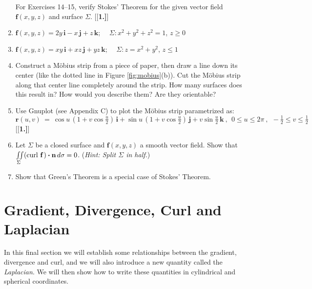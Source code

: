 \begin{enumerate}[\bfseries 1.]
\par\noindent For Exercises 14--15, verify Stokes' Theorem for the given vector field $\textbf{f}(x,y,z)$ and
surface $\Sigma$.
[{[\bfseries 1.]}]
 \item $\textbf{f}(x,y,z) = 2y\,\textbf{i} - x\,\textbf{j} + z\,\textbf{k}$; $\quad \Sigma: x^2 + y^2 + z^2 = 1$,
  $z \ge 0$
 \item $\textbf{f}(x,y,z) = xy\,\textbf{i} + xz\,\textbf{j} + yz\,\textbf{k}$; $\quad \Sigma: z=x^2 + y^2$, $z \le 1$
 \item Construct a M\"{o}bius strip from a piece of paper, then draw a line down its center (like the dotted line in
 Figure \ref{fig:mobius}(b)). Cut the M\"{o}bius strip along that center line completely around the strip. How many
 surfaces does this result in? How would you describe them? Are they orientable?
 \item Use Gnuplot (see Appendix C) to plot the M\"{o}bius strip parametrized as:
  \begin{displaymath}
   \textbf{r}(u,v) ~=~ \cos u \,(1+v\cos \tfrac{u}{2})\,\textbf{i} + \sin u \,(1+v\cos \tfrac{u}{2})\,\textbf{j} +
    v\sin \tfrac{u}{2}\,\textbf{k} ~,~~ 0 \le u \le 2\pi ~,~~ -\tfrac{1}{2} \le v \le \tfrac{1}{2}
  \end{displaymath}
[{[\bfseries 1.]}]
 \item Let $\Sigma$ be a closed surface and $\textbf{f}(x,y,z)$ a smooth vector field. Show that\\
  $\iint\limits_{\Sigma} (\text{curl}~{\textbf{f}}\,) \bm{\cdot} \textbf{n}\,d\sigma = 0$. (\emph{Hint: Split $\Sigma$
  in half.})
 \item Show that Green's Theorem is a special case of Stokes' Theorem.
\end{enumerate}
\newpage
\section{Gradient, Divergence, Curl and Laplacian}
In this final section we will establish some relationships between the gradient, divergence and curl, and we will
also introduce a new quantity called the \emph{Laplacian}. We will then show how to write these quantities in
cylindrical and spherical coordinates.

